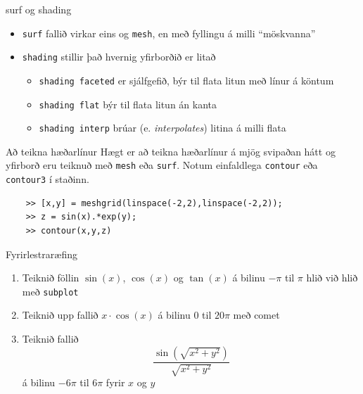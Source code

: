 \documentclass[handout]{beamer}
\begin{document}
\begin{frame}{surf og shading}
\begin{itemize}
 \item \texttt{surf} fallið virkar eins og \texttt{mesh}, en með fyllingu á milli ``möskvanna''
 \item \texttt{shading} stillir það hvernig yfirborðið er litað
 \begin{itemize}
  \item \texttt{shading faceted} er sjálfgefið, býr til flata litun með línur á köntum
  \item \texttt{shading flat} býr til flata litun án kanta
  \item \texttt{shading interp} brúar (e. \emph{interpolates}) litina á milli flata
 \end{itemize}
\end{itemize}
\end{frame}

\begin{frame}[fragile]{Að teikna hæðarlínur}
    Hægt er að teikna hæðarlínur á mjög svipaðan hátt og yfirborð eru teiknuð með \texttt{mesh} eða \texttt{surf}. Notum einfaldlega \texttt{contour} eða \texttt{contour3} í staðinn.
    
    \begin{verbatim}
    >> [x,y] = meshgrid(linspace(-2,2),linspace(-2,2));
    >> z = sin(x).*exp(y);
    >> contour(x,y,z)
    \end{verbatim}    
\end{frame}

\begin{frame}{Fyrirlestraræfing}
    \begin{enumerate}
     \item Teiknið föllin $\sin(x)$, $\cos(x)$ og $\tan(x)$ á bilinu $-\pi$ til $\pi$ hlið við hlið með \texttt{subplot}
     \item Teiknið upp fallið $x\cdot \cos(x)$ á bilinu $0$ til $20\pi$ með comet
     \item Teiknið fallið
     \[
     \frac{\sin(\sqrt{x^2 + y^2})}{\sqrt{x^2 + y^2}}
     \]
     á bilinu $-6\pi$ til $6\pi$ fyrir $x$ og $y$
    \end{enumerate}
\end{frame}
\end{document}
